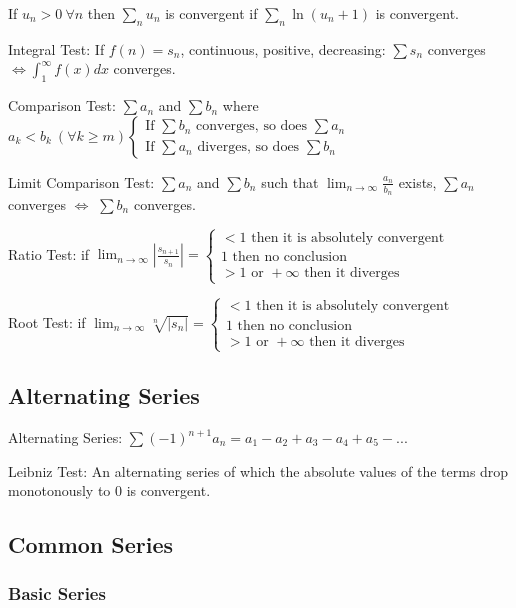 If $u_n>0~\forall n$ then $\sum\limits_n u_n$ is convergent if 
$\sum\limits_n\ln(u_n+1)$ is convergent.

Integral Test: If $ f(n) = s_n $, continuous, positive, decreasing: $\sum s_n$ converges $ \Leftrightarrow \int_{1}^{\infty}f(x)dx $ converges.

Comparison Test: $\sum a_n$ and $\sum b_n$ where $a_k<b_k ~ (\forall k\ge m) 
\begin{cases}
\text{If } \sum b_n \text{ converges, so does } \sum a_n \\
\text{If } \sum a_n \text{ diverges, so does } \sum b_n
\end{cases}
$

Limit Comparison Test: $\sum a_n$ and $\sum b_n$ such that $ \lim_{n\rightarrow\infty} \frac{a_n}{b_n}$ exists, $\sum a_n$ converges $\Leftrightarrow$ $\sum b_n$ converges.

Ratio Test: if $\lim_{n\rightarrow \infty}\left|\frac{s_{n+1}}{s_n}\right| = \begin{cases}
<1 \text{ then it is absolutely convergent} \\
1 \text{ then no conclusion} \\
>1 \text{ or } +\infty \text{ then it diverges}
\end{cases}
$

Root Test: if  $\lim_{n\rightarrow \infty} \sqrt[n]{\left|s_n\right|} = \begin{cases}
<1 \text{ then it is absolutely convergent} \\
1 \text{ then no conclusion} \\
>1 \text{ or } +\infty \text{ then it diverges}
\end{cases}
$

\subsection{Alternating Series}
Alternating Series: $ \sum(-1)^{n+1}a_n=a_1-a_2+a_3-a_4+a_5-... $

Leibniz Test: An alternating series of which the absolute values of the terms drop
monotonously to 0 is convergent.

\subsection{Common Series}
\subsubsection{Basic Series}

